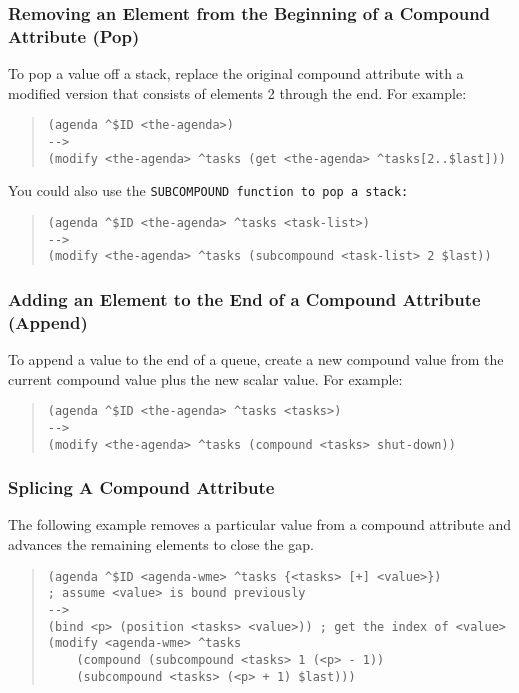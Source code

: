 \subsubsection*{Removing an Element from the Beginning of a Compound
  Attribute (Pop)}

To pop a value off a stack, replace the original compound attribute
with a modified version that consists of elements 2 through the
end. For example:
\begin{quote}
\begin{verbatim}
(agenda ^$ID <the-agenda>)
-->
(modify <the-agenda> ^tasks (get <the-agenda> ^tasks[2..$last]))
\end{verbatim}
\end{quote}
You could also use the \tt{SUBCOMPOUND} function to pop a stack:
\begin{quote}
\begin{verbatim}
(agenda ^$ID <the-agenda> ^tasks <task-list>)
-->
(modify <the-agenda> ^tasks (subcompound <task-list> 2 $last))
\end{verbatim}
\end{quote}

\subsubsection*{Adding an Element to the End of a Compound Attribute
  (Append)}

To append a value to the end of a queue, create a new compound value
from the current compound value plus the new scalar value. For
example:
\begin{quote}
\begin{verbatim}
(agenda ^$ID <the-agenda> ^tasks <tasks>)
-->
(modify <the-agenda> ^tasks (compound <tasks> shut-down))
\end{verbatim}
\end{quote}

\subsubsection*{Splicing A Compound Attribute}

The following example removes a particular value from a compound
attribute and advances the remaining elements to close the gap.
\begin{quote}
\begin{verbatim}
(agenda ^$ID <agenda-wme> ^tasks {<tasks> [+] <value>})
; assume <value> is bound previously
-->
(bind <p> (position <tasks> <value>)) ; get the index of <value>
(modify <agenda-wme> ^tasks
    (compound (subcompound <tasks> 1 (<p> - 1))
    (subcompound <tasks> (<p> + 1) $last)))
\end{verbatim}
\end{quote}


